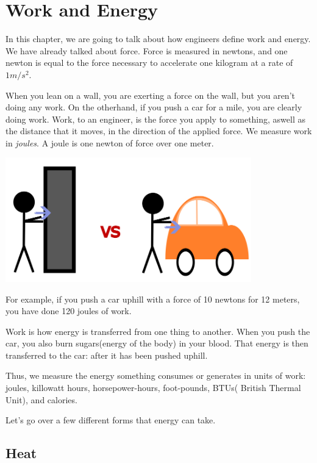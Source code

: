 \chapter{Work and Energy}

In this chapter, we are going to talk about how engineers define work
and energy.  We have already talked about force. Force is measured in
newtons, and one newton is equal to the force necessary to accelerate one
kilogram at a rate of $1 m/s^2$.

When you lean on a wall, you are exerting a force on the wall, but you
aren't doing any work. On the otherhand, if you push a car for a mile,
you are clearly doing work. Work, to an engineer, is the force you
apply to something, aswell as the distance that it moves, in the direction
of the applied force. We measure work in \textit{joules}. A joule is one
newton of force over one meter.

\includegraphics[width=0.8\textwidth]{Work_vs.png}

For example, if you push a car uphill with a force of 10 newtons for 12
meters, you have done 120 joules of work.

Work is how energy is transferred from one thing to another. When you
push the car, you also burn sugars(energy of the body) in your blood. That energy is then
transferred to the car: after it has been pushed uphill.

Thus, we measure the energy something consumes or generates in 
units of work: joules, killowatt hours, horsepower-hours, foot-pounds,
BTUs( British Thermal Unit), and calories.

Let's go over a few different forms that energy can take.
\section{Heat}

